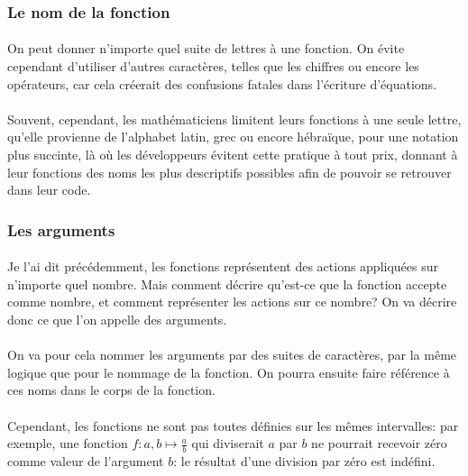 \documentclass[a4paper]{book}
\begin{document}
    \subsubsection{Le nom de la fonction}
    \paragraph{}
    On peut donner n'importe quel suite de lettres à une fonction. On évite cependant d'utiliser d'autres caractères, telles que les chiffres ou encore les opérateurs, car cela créerait des confusions fatales dans l'écriture d'équations.
    \paragraph{}
    Souvent, cependant, les mathématiciens limitent leurs fonctions à une seule lettre, qu'elle provienne de l'alphabet latin, grec ou encore hébraïque, pour une notation plus succinte, là où les développeurs évitent cette pratique à tout prix, donnant à leur fonctions des noms les plus descriptifs possibles afin de pouvoir se retrouver dans leur code.
    
    \subsubsection{Les arguments}
    \paragraph{}
    Je l'ai dit précédemment, les fonctions représentent des actions appliquées sur n'importe quel nombre. Mais comment décrire qu'est-ce que la fonction accepte comme nombre, et comment représenter les actions sur ce nombre? On va décrire donc ce que l'on appelle des arguments. 
    \paragraph{}
    On va pour cela nommer les arguments par des suites de caractères, par la même logique que pour le nommage de la fonction. On pourra ensuite faire référence à ces noms dans le corps de la fonction.
    \paragraph{}
    Cependant, les fonctions ne sont pas toutes définies sur les mêmes intervalles: par exemple, une fonction $f:a,b\mapsto\frac{a}{b}$ qui diviserait $a$ par $b$ ne pourrait recevoir zéro comme valeur de l'argument $b$: le résultat d'une division par zéro est indéfini. 
\end{document}
